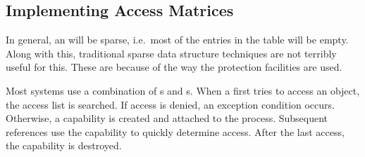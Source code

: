 \subsection{Implementing Access Matrices}\label{subsec:Implement_Access_Matrices}
In general, an  will be sparse, i.e.\ most of the entries in the table will be empty.
Along with this, traditional sparse data structure techniques are not terribly useful for this.
These are because of the way the protection facilities are used.

Most systems use a combination of s and s.
When a  first tries to access an object, the access list is searched.
If access is denied, an exception condition occurs.
Otherwise, a capability is created and attached to the process.
Subsequent references use the capability to quickly determine access.
After the last access, the capability is destroyed.


